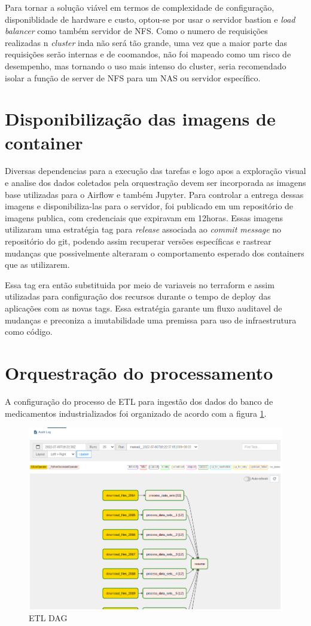 Para tornar a solução viável em termos de complexidade de configuração, disponiblidade de hardware e custo, optou-se por usar o servidor bastion e \emph{load balancer} como também servidor de NFS. Como o numero de requisições realizadas n \emph{cluster} inda não será tão grande, uma vez que a maior parte das requisições serão internas e de coomandos, não foi mapeado como um risco de desempenho, mas tornando o uso mais intenso do cluster, seria recomendado isolar a função de server de NFS para um NAS ou servidor específico.

\section{Disponibilização das imagens de container}

Diversas dependencias para a execução das tarefas e logo apos a exploração visual e analise dos dados coletados pela orquestração devem ser incorporada as imagens base utilizadas para o Airflow e também Jupyter. Para controlar a entrega dessas imagens e disponibiliza-las para o servidor, foi publicado em um repositório de imagens publica, com credenciais que expiravam em 12horas. Essas imagens utilizaram uma estratégia tag para \emph{release} associada ao \emph{commit message} no repositório do git, podendo assim recuperar versões específicas e rastrear mudanças que possivelmente alteraram o comportamento esperado dos containers que as utilizarem. 

Essa tag era então substituida por meio de variaveis no terraform e assim utilizadas para configuração dos recursos durante o tempo de deploy das aplicações com as novas tags. Essa estratégia garante um fluxo auditavel de mudanças e preconiza a imutabilidade uma premissa para uso de infraestrutura como código. 

\section{Orquestração do processamento}
A configuração do processo de ETL para ingestão dos dados do banco de medicamentos industrializados foi organizado de acordo com a figura \ref{fig:airflowdag}.
\begin{figure}[!ht]
    \centering
    \includegraphics[width=0.8\linewidth]{04-figuras/graph_execution.png}
    \caption{ETL DAG}
    \label{fig:airflowdag}
\end{figure}

